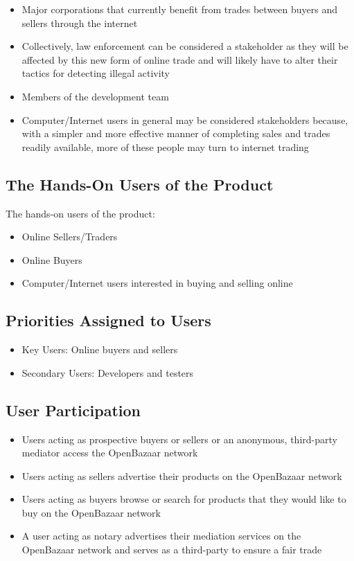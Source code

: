 \documentclass{article}
\begin{document}
\begin{itemize}
\item
Major corporations that currently benefit from trades between buyers and sellers through the internet

\item
Collectively, law enforcement can be considered a stakeholder as they will be affected by this new form of online trade and will likely have to alter their tactics for detecting illegal activity

\item
Members of the development team

\item
Computer/Internet users in general may be considered stakeholders because, with a simpler and more effective manner of completing sales and trades readily available, more of these people may turn to internet trading
\end{itemize}


\subsection{The Hands-On Users of the Product}
The hands-on users of the product:
\begin{itemize}
\item
Online Sellers/Traders

\item
Online Buyers

\item
Computer/Internet users interested in buying and selling online
\end{itemize}

\subsection{Priorities Assigned to Users}
\begin{itemize}
\item
Key Users: Online buyers and sellers

\item
Secondary Users: Developers and testers
\end{itemize}

\subsection{User Participation}
\begin{itemize}
\item 
Users acting as prospective buyers or sellers or an anonymous, third-party mediator access the OpenBazaar network		

\item
Users acting as sellers advertise their products on the OpenBazaar network

\item
Users acting as buyers browse or search for products that they would like to buy on the OpenBazaar network

\item
A user acting as notary advertises their mediation services on the OpenBazaar network and serves as a third-party to ensure a fair trade
\end{itemize}
\end{document}
